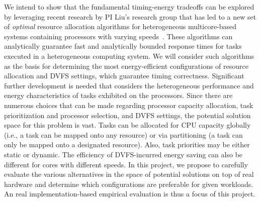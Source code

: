 We intend to show that the fundamental timing-energy tradeoffs can be explored by leveraging recent research by PI Liu's research group that has led to a new set of \textit{optimal} resource allocation algorithms for  heterogeneous multicore-based systems containing processors with varying speeds~\cite{Tong14a, Zhou2014a}. These algorithms can analytically guarantee fast and analytically bounded response times for tasks  executed in a heterogeneous computing system.  %
We will consider such algorithms as the basis for determining the most energy-efficient configurations of resource allocation and DVFS settings, which guarantee timing correctness. Significant further development is needed that considers the heterogeneous performance and energy characteristics of tasks exhibited on the processors.
 Since there are numerous choices that can be made regarding processor capacity allocation,  task prioritization and processor selection, and DVFS settings, the potential solution space for this problem is vast. Tasks can be allocated for CPU capacity globally (i.e., a task can be mapped onto any resource) or via partitioning (a task can only be mapped onto a designated resource). Also, task priorities may be either static or dynamic. %
 The efficiency of DVFS-incurred energy saving can also be different for cores with different speeds. 
 In this project, we propose to carefully evaluate the various alternatives in the space of potential solutions on top of real hardware and determine which configurations are preferable for given workloads. An real implementation-based empirical evaluation is thus a focus of this project.

